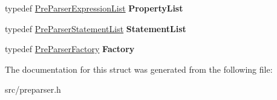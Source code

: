\begin{DoxyCompactItemize}
\item 
\hypertarget{structv8_1_1internal_1_1_pre_parser_traits_1_1_type_a9172f99158c4c5103827d6e3c16d64a7}{}typedef \hyperlink{classv8_1_1internal_1_1_pre_parser_expression_list}{Pre\+Parser\+Expression\+List} {\bfseries Property\+List}\label{structv8_1_1internal_1_1_pre_parser_traits_1_1_type_a9172f99158c4c5103827d6e3c16d64a7}

\item 
\hypertarget{structv8_1_1internal_1_1_pre_parser_traits_1_1_type_a58d876eeb90dee667f745677fab14379}{}typedef \hyperlink{classv8_1_1internal_1_1_pre_parser_statement_list}{Pre\+Parser\+Statement\+List} {\bfseries Statement\+List}\label{structv8_1_1internal_1_1_pre_parser_traits_1_1_type_a58d876eeb90dee667f745677fab14379}

\item 
\hypertarget{structv8_1_1internal_1_1_pre_parser_traits_1_1_type_a7bcefb48652297497c8d50c80f0e10fc}{}typedef \hyperlink{classv8_1_1internal_1_1_pre_parser_factory}{Pre\+Parser\+Factory} {\bfseries Factory}\label{structv8_1_1internal_1_1_pre_parser_traits_1_1_type_a7bcefb48652297497c8d50c80f0e10fc}

\end{DoxyCompactItemize}


The documentation for this struct was generated from the following file\+:\begin{DoxyCompactItemize}
\item 
src/preparser.\+h\end{DoxyCompactItemize}
